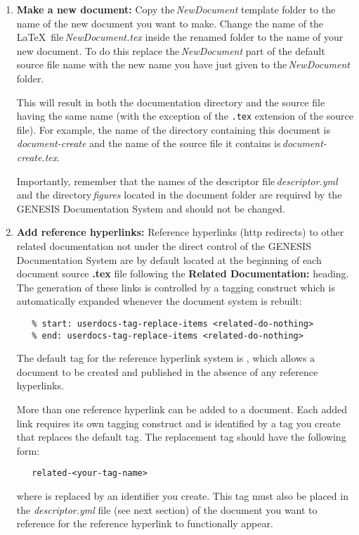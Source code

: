 \documentclass[12pt]{article}
\begin{document}
\begin{enumerate}

\item {\bf Make a new document:} Copy the\,{\it NewDocument} template folder to the name of the new document you want to make. Change the name of the \LaTeX\,\,\,file\,{\it NewDocument.tex} inside the renamed folder to the name of your new document. To do this replace the\,{\it NewDocument} part of the default source file name with the new name you have just given to the\,{\it NewDocument} folder.

This will result in both the documentation directory and the source file having the same name (with the exception of the {\tt .tex} extension of the source file). For example, the name of the directory containing this document is {\it document-create} and the name of the source file it contains is\,{\it document-create.tex}.

Importantly, remember that the names of the descriptor file\,{\it descriptor.yml} and the directory\,{\it figures} located in the document folder are required by the GENESIS Documentation System and should not be changed.

\item {\bf Add reference hyperlinks:} Reference hyperlinks (http redirects) to other related documentation not under the direct control of the GENESIS Documentation System are by default located at the beginning of each document source {\bf .tex} file following the {\bf Related Documentation:} heading. The generation of these links is controlled by a tagging construct which is automatically expanded whenever the document system is rebuilt:
\begin{verbatim}
   % start: userdocs-tag-replace-items <related-do-nothing>
   % end: userdocs-tag-replace-items <related-do-nothing>
\end{verbatim}
The default tag for the reference hyperlink system is {\tt <related-do-nothing>}, which allows a document to be created and published in the absence of any reference hyperlinks. 

More than one reference hyperlink can be added to a document. Each added link requires its own tagging construct and is identified by a tag you create that replaces the default tag. The replacement tag should have the following form:
\begin{verbatim}
   related-<your-tag-name>
\end{verbatim}
where {\tt <your-tag-name>} is replaced by an identifier you create. This tag must also be placed in the {\it descriptor.yml} file (see next section) of the document you want to reference for the reference hyperlink to functionally appear.


\end{enumerate}
\end{document}
